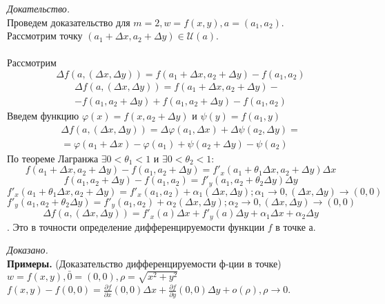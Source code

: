 \documentclass[a4paper,14pt]{article} %
\begin{document}
	 \textit{Докательство.}\\
	 Проведем доказательство для $m = 2, w = f(x, y), a = (a_1, a_2)$. \\
	 Рассмотрим точку $(a_1 + \Delta x, a_2 + \Delta y) \in \mathscr{U}(a)$.\\\\
	 Рассмотрим 
	 \[\Delta f(a, (\Delta x, \Delta y)) = f(a_1 + \Delta x, a_2 + \Delta y) - f(a_1, a_2)\]
	 \begin{multline*}
	 \Delta f(a, (\Delta x, \Delta y)) = f(a_1 + \Delta x, a_2 + \Delta y) - \\
	 - f(a_1, a_2 + \Delta y) + f(a_1, a_2 + \Delta y) - f(a_1, a_2)
	 \end{multline*}
	 Введем функцию $\varphi(x) = f(x, a_2 + \Delta y)$ и $\psi(y) = f(a_1, y)$
	 \begin{multline*}
	 \Delta f(a, (\Delta x, \Delta y)) = \Delta\varphi(a_1, \Delta x) + \Delta\psi(a_2, \Delta y) = \\
	 = \varphi(a_1 + \Delta x) - \varphi(a_1) + \psi(a_2 + \Delta y) - \psi(a_2)
	 \end{multline*}
	 По теореме Лагранжа $\exists 0 < \theta_1 < 1$ и $\exists 0 < \theta_2 < 1:$
	 \[f(a_1 + \Delta x, a_2 + \Delta y) - f(a_1, a_2 + \Delta y) = f'_x(a_1 + \theta_1 \Delta x, a_2 + \Delta y)\Delta x\]
	 \[f(a_1, a_2 + \Delta y) - f(a_1, a_2) = f'_y(a_1, a_2 + \theta_2 \Delta y)\Delta y\]
	 \[f'_x(a_1 + \theta_1\Delta x, a_2 + \Delta y) = f'_x(a_1, a_2) + \alpha_1(\Delta x, \Delta y); \alpha_1 \to 0, (\Delta x, \Delta y) \to (0, 0)\]
	  \[f'_y(a_1, a_2 + \theta_2 \Delta y) = f'_y(a_1, a_2) + \alpha_2(\Delta x, \Delta y); \alpha_2 \to 0,  (\Delta x, \Delta y) \to (0, 0)\]
	  \[\Delta f(a, (\Delta x, \Delta y)) = f'_x(a)\Delta x +f'_y(a)\Delta y + \alpha_1\Delta x + \alpha_2 \Delta y\]. Это в точности определение дифференцируемости функции $f$ в точке $а$.
	  
	  \textit{Доказано.}	  \\
	  
	 \textbf{Примеры.} (Доказательство дифференцируемости ф-ции в точке)\\
	 $w = f(x, y), \bar0 = (0,0), \rho = \sqrt{x^2 + y^2 }$\\ 
	 $f(x, y) - f(0, 0)= \frac{\partial f}{\partial x}(0, 0)\Delta x + \frac{\partial f}{\partial y}(0, 0)\Delta y + o(\rho), \rho \to 0$.\\
	 
\end{document}
